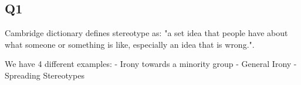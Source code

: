 \subsection{Q1}

Cambridge dictionary defines stereotype as: "a set idea that people have about what someone or something is like, especially an idea that is wrong.".

We have 4 different examples:
- Irony towards a minority group
- General Irony
- Spreading Stereotypes
